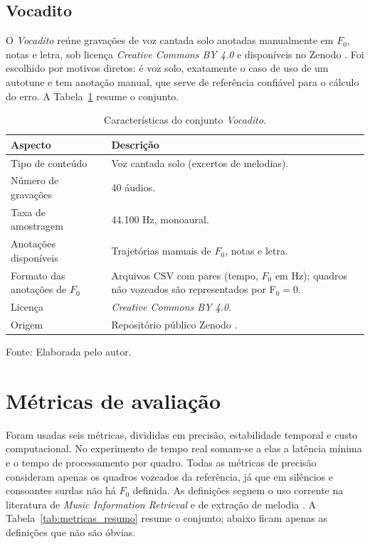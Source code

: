 \subsection{Vocadito}
O \textit{Vocadito} \cite{bittner2022vocadito} reúne gravações de voz cantada solo anotadas manualmente em $F_0$, notas e letra, sob licença \textit{Creative Commons BY 4.0} e disponíveis no Zenodo \cite{bittner2022vocadito_zenodo}. Foi escolhido por motivos diretos: é voz solo, exatamente o caso de uso de um autotune e tem anotação manual, que serve de referência confiável para o cálculo do erro. A Tabela~\ref{tab:vocadito} resume o conjunto.

\begin{table}[H]
\centering
\caption{\label{tab:vocadito}Características do conjunto \textit{Vocadito}.}
\small
\begin{tabular}{|p{4.5cm}|p{9.5cm}|}
\hline
\textbf{Aspecto} & \textbf{Descrição} \\
\hline
Tipo de conteúdo & Voz cantada solo (excertos de melodias). \\
\hline
Número de gravações & 40 áudios. \\
\hline
Taxa de amostragem & 44{.}100 Hz, monoaural. \\
\hline
Anotações disponíveis & Trajetórias manuais de $F_0$, notas e letra. \\
\hline
Formato das anotações de $F_0$ & Arquivos CSV com pares (tempo, $F_0$ em Hz);
quadros não vozeados são representados por F$_0 = 0$. \\
\hline
Licença & \textit{Creative Commons BY 4.0}. \\
\hline
Origem & Repositório público Zenodo \cite{bittner2022vocadito_zenodo}. \\
\hline
\end{tabular}
\small Fonte: Elaborada pelo autor.
\end{table}

\section{Métricas de avaliação}

Foram usadas seis métricas, divididas em precisão, estabilidade temporal e custo computacional. No experimento de tempo real somam-se a elas a latência mínima e o tempo de processamento por quadro. Todas as métricas de precisão consideram apenas os quadros vozeados da referência, já que em silêncios e consoantes surdas não há $F_0$ definida. As definições seguem o uso corrente na literatura de \textit{Music Information Retrieval} e de extração de melodia \cite{salamon2014melody,raffel2014mir_eval,mauch2014pyin}. A Tabela~\ref{tab:metricas_resumo} resume o conjunto; abaixo ficam apenas as definições que não são óbvias.


